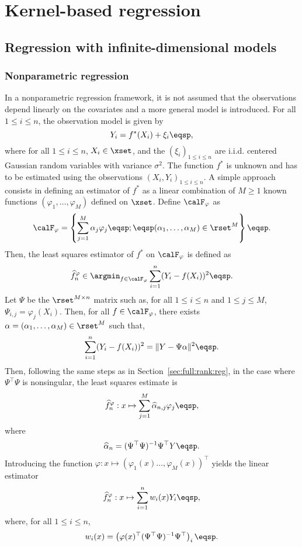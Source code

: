 \chapter{Kernel-based regression}
\minitoc

\section{Regression with infinite-dimensional models}

\subsection{Nonparametric regression}
In a nonparametric regression framework, it is not assumed that the observations depend linearly on the covariates and a more general model is introduced. For all $1\leqslant i\leqslant n$, the observation model is given by
\[
Y_{i}=f^*(X_{i})+\xi_{i}\eqsp,
\]
where for all $1\leqslant i\leqslant n$, $X_i\in\xset$, and the $(\xi_{i})_{1\leqslant i \leqslant n}$ are i.i.d. centered Gaussian random variables with variance $\sigma^2$. The function $f^*$ is unknown and has to be estimated using the observations $(X_i,Y_i)_{1\leqslant i\leqslant n}$. A simple approach consists in defining an estimator of $f^*$ as a linear combination of $M\geqslant 1$ known functions $(\varphi_1,\ldots,\varphi_M)$ defined on $\xset$. Define $\calF_\varphi$ as
\[
\calF_\varphi = \left\{\sum_{j=1}^M \alpha_j \varphi_j\eqsp;\eqsp (\alpha_1,\ldots,\alpha_M)\in\rset^M\right\}\eqsp.
\]
Then, the least squares estimator of $f^*$ on $\calF_\varphi$ is defined as
\[
\widehat f^\varphi_n\in  \argmin_{f \in \calF_\varphi}  \sum_{i=1}^n(Y_i - f(X_i))^2\eqsp.
\]
Let $\Psi$ be the $\rset^{M\times n}$ matrix such as, for all $1\leqslant i\leqslant n$ and $1\leqslant j\leqslant M$, $\Psi_{i,j} = \varphi_j(X_i)$. Then, for all $f \in \calF_\varphi$, there exists $\alpha = (\alpha_1,\ldots,\alpha_M)\in\rset^M$ such that,
\[
 \sum_{i=1}^n(Y_i - f(X_i))^2 = \|Y - \Psi \alpha\|^2\eqsp.
\]
Then, following the same steps as in Section~\ref{sec:full:rank:reg}, in the case where $\Psi^\top \Psi$ is nonsingular, the least squares estimate is
\begin{equation}
\label{eq:def:nonparam:reg}
\widehat f^\varphi_n: x\mapsto \sum_{j=1}^M \widehat\alpha_{n,j} \varphi_j\eqsp,
\end{equation}
where
\[
\widehat\alpha_{n} = (\Psi^\top \Psi)^{-1}\Psi^\top Y\eqsp.
\]
Introducing the function $\varphi: x\mapsto (\varphi_1(x)\ldots,\varphi_M(x))^\top$ yields the linear estimator 
\[
\widehat f^\varphi_n: x \mapsto \sum_{i = 1}^n w_i(x)Y_i\eqsp,
\]
where, for all $1\leqslant i\leqslant n$,
\[
w_i(x) = \left(\varphi(x)^\top(\Psi^\top\Psi)^{-1}\Psi^\top\right)_i\eqsp.
\]

